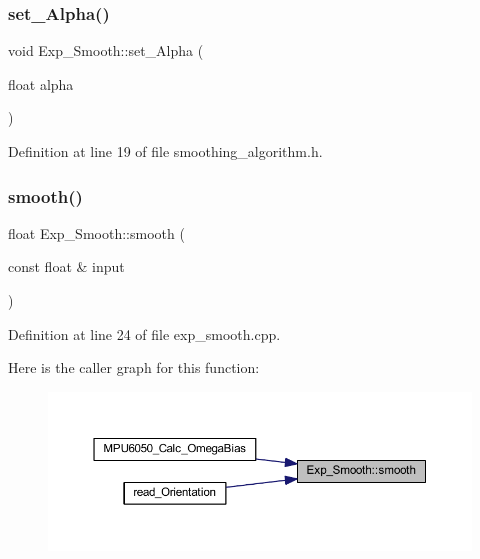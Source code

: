\mbox{\label{class_exp___smooth_a4c87027d0aaaef41619f63b7358f9ef8}} 
\subsubsection{\texorpdfstring{set\_Alpha()}{set\_Alpha()}}
{\footnotesize\ttfamily void Exp\+\_\+\+Smooth\+::set\+\_\+\+Alpha (\begin{DoxyParamCaption}\item[{float}]{alpha }\end{DoxyParamCaption})\hspace{0.3cm}{\ttfamily [inline]}}



Definition at line 19 of file smoothing\+\_\+algorithm.\+h.

\mbox{\label{class_exp___smooth_a1815075200efb490ced9f1e34e5e63bf}} 
\subsubsection{\texorpdfstring{smooth()}{smooth()}}
{\footnotesize\ttfamily float Exp\+\_\+\+Smooth\+::smooth (\begin{DoxyParamCaption}\item[{const float \&}]{input }\end{DoxyParamCaption})}



Definition at line 24 of file exp\+\_\+smooth.\+cpp.

Here is the caller graph for this function\+:
\nopagebreak
\begin{figure}[H]
\begin{center}
\leavevmode
\includegraphics[width=350pt]{class_exp___smooth_a1815075200efb490ced9f1e34e5e63bf_icgraph}
\end{center}
\end{figure}


